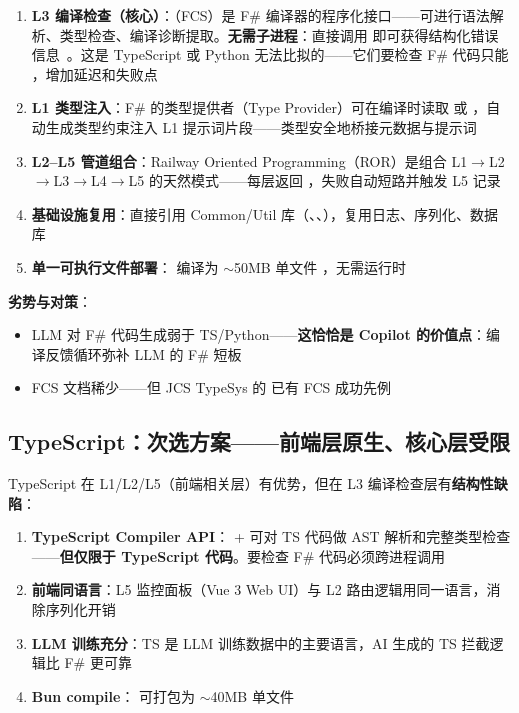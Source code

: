 \documentclass[10pt, openany]{book}
\begin{document}
\begin{enumerate}
    \item \textbf{L3 编译检查（核心）}：（FCS）是 F\# 编译器的程序化接口——可进行语法解析、类型检查、编译诊断提取。\textbf{无需子进程}：直接调用  即可获得结构化错误信息~\cite{Syme2007FSharp}。这是 TypeScript 或 Python 无法比拟的——它们要检查 F\# 代码只能 ，增加延迟和失败点
    \item \textbf{L1 类型注入}：F\# 的类型提供者（Type Provider）可在编译时读取  或 ，自动生成类型约束注入 L1 提示词片段——类型安全地桥接元数据与提示词
    \item \textbf{L2--L5 管道组合}：Railway Oriented Programming（ROR）是组合 L1\(\to\)L2\(\to\)L3\(\to\)L4\(\to\)L5 的天然模式——每层返回 ，失败自动短路并触发 L5 记录
    \item \textbf{基础设施复用}：直接引用 Common/Util 库（、、），复用日志、序列化、数据库
    \item \textbf{单一可执行文件部署}： 编译为 \(\sim\)50MB 单文件 ，无需运行时
\end{enumerate}

\textbf{劣势与对策}：
\begin{itemize}
    \item LLM 对 F\# 代码生成弱于 TS/Python——\textbf{这恰恰是 Copilot 的价值点}：编译反馈循环弥补 LLM 的 F\# 短板
    \item FCS 文档稀少——但 JCS TypeSys 的  已有 FCS 成功先例
\end{itemize}

\subsection{TypeScript：次选方案——前端层原生、核心层受限}

TypeScript 在 L1/L2/L5（前端相关层）有优势，但在 L3 编译检查层有\textbf{结构性缺陷}：

\begin{enumerate}
    \item \textbf{TypeScript Compiler API}： +  可对 TS 代码做 AST 解析和完整类型检查——\textbf{但仅限于 TypeScript 代码}。要检查 F\# 代码必须跨进程调用
    \item \textbf{前端同语言}：L5 监控面板（Vue 3 Web UI）与 L2 路由逻辑用同一语言，消除序列化开销
    \item \textbf{LLM 训练充分}：TS 是 LLM 训练数据中的主要语言，AI 生成的 TS 拦截逻辑比 F\# 更可靠
    \item \textbf{Bun compile}： 可打包为 \(\sim\)40MB 单文件
\end{enumerate}
\end{document}
